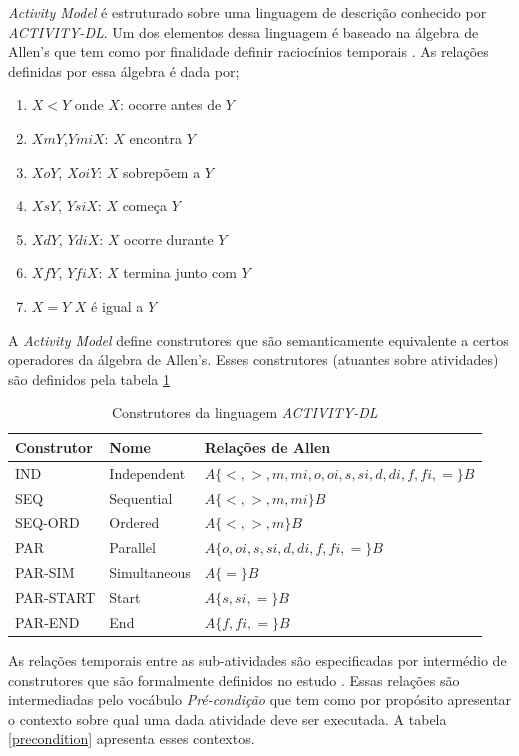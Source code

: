 \textit{Activity Model} é estruturado sobre uma linguagem de descrição conhecido por \textit{ACTIVITY-DL}. Um dos elementos dessa linguagem é baseado na álgebra de Allen's que tem como por finalidade definir raciocínios temporais \cite{allenalgebric}. 
As relações definidas por essa álgebra é dada por; 

\begin{enumerate}
	\item $X < Y$ onde $X$: ocorre antes de $Y$ 
	\item $X m Y$,$Y mi X$: $X$ encontra $Y$
	\item $X o Y$, $X oi Y$: $X$ sobrepõem a $Y$
	\item $X s Y$, $Y si X$: $X$ começa $Y$
	\item $X d Y$, $Y di X$: $X$ ocorre durante $Y$	  
	\item $X f Y$, $Y fi X$: $X$ termina junto com $Y$	  	
	\item $X = Y$ $X$ é igual a $Y$	  		
\end{enumerate}

A \textit{Activity Model} define construtores que são semanticamente equivalente a certos operadores da álgebra de Allen's. Esses construtores (atuantes sobre atividades) são definidos pela tabela \ref{acticonstruct}

\begin{table}[H]
\centering
\begin{tabular}{|l|l|l|}
\hline
Construtor & Nome         & Relações de Allen \\ \hline
IND        & Independent  & $A \{ <,>,m,mi,o,oi,s,si,d,di,f,fi,= \} B$\\ \hline
SEQ        & Sequential   & $A \{ <,>,m,mi \} B$\\ \hline
SEQ-ORD    & Ordered      & $A \{ <,>,m \} B$\\ \hline
PAR        & Parallel     & $A \{ o,oi,s,si,d,di,f,fi,= \} B$ \\ \hline
PAR-SIM    & Simultaneous & $A \{ = \} B$\\ \hline
PAR-START  & Start        & $A \{ s,si,= \} B$\\ \hline
PAR-END    & End          & $A \{ f,fi,= \} B$ \\ \hline
\end{tabular}
\caption{Construtores da linguagem \textit{ACTIVITY-DL} \cite{v3sframework}}
\label{acticonstruct}
\end{table}

As relações temporais entre as sub-atividades são especificadas por intermédio de construtores que são formalmente definidos no estudo \cite{allenalgebric}. Essas relações são intermediadas pelo vocábulo \textit{Pré-condição} que tem como por propósito apresentar o contexto sobre qual uma dada atividade deve ser executada. A tabela \ref{precondition} apresenta esses contextos.

